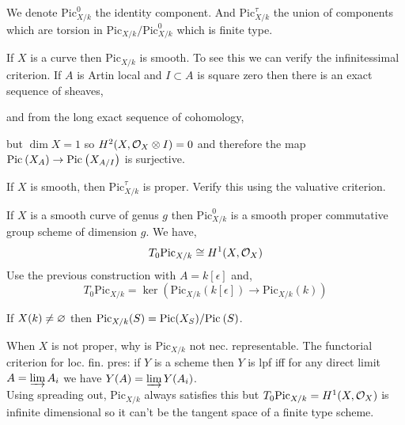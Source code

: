 \documentclass[12pt]{article}
\begin{document}
\begin{rmk}
We denote $\mathrm{Pic}^0_{X/k}$ the identity component. And $\mathrm{Pic}^{\tau}_{X/k}$ the union of components which are torsion in $\mathrm{Pic}_{X/k} / \mathrm{Pic}^0_{X/k}$ which is finite type.
\end{rmk}

\begin{example}
If $X$ is a curve then $\mathrm{Pic}_{X/k}$ is smooth. To see this we can verify the infinitessimal criterion. If $A$ is Artin local and $I \subset A$ is square zero then there is an exact sequence of sheaves,
\begin{center}
\end{center}
and from the long exact sequence of cohomology,
\begin{center}
\end{center}
but $\dim{X} = 1$ so $H^2(X, \mathcal{O}_{X} \otimes I) = 0$ and therefore the map $\mathrm{Pic}^{} \left( X_A \right) \to \mathrm{Pic}^{} \left( X_{A/I} \right)$ is surjective.
\end{example}

\begin{example}
If $X$ is smooth, then $\mathrm{Pic}^{\tau}_{X/k}$ is proper. Verify this using the valuative criterion.
\end{example}

\begin{example}
If $X$ is a smooth curve of genus $g$ then $\mathrm{Pic}^0_{X/k}$ is a smooth proper commutative group scheme of dimension $g$. We have,
\[ T_0 \mathrm{Pic}_{X/k} \cong H^1(X, \mathcal{O}_{X}) \]
Use the previous construction with $A = k[\epsilon]$ and,
\[ T_0 \mathrm{Pic}_{X/k} = \ker{(\mathrm{Pic}_{X/k}(k[\epsilon]) \to \mathrm{Pic}_{X/k}(k))} \]
\end{example}

\begin{rmk}
If $X(k) \neq \varnothing$ then $\mathrm{Pic}_{X/k}(S) = \mathrm{Pic}(X_S) / \mathrm{Pic}^{} \left( S \right)$. 
\end{rmk}

\begin{rmk}
When $X$ is not proper, why is $\mathrm{Pic}_{X/k}$ not nec. representable. The functorial criterion for loc. fin. pres: if $Y$ is a scheme then $Y$ is lpf iff for any direct limit $A = \varinjlim A_i$ we have $Y(A) = \varinjlim Y(A_i)$.
\bigskip\\
Using spreading out, $\mathrm{Pic}_{X/k}$ always satisfies this but $T_0 \mathrm{Pic}_{X/k} = H^1(X, \mathcal{O}_{X})$ is infinite dimensional so it can't be the tangent space of a finite type scheme.
\end{rmk}
\end{document}
